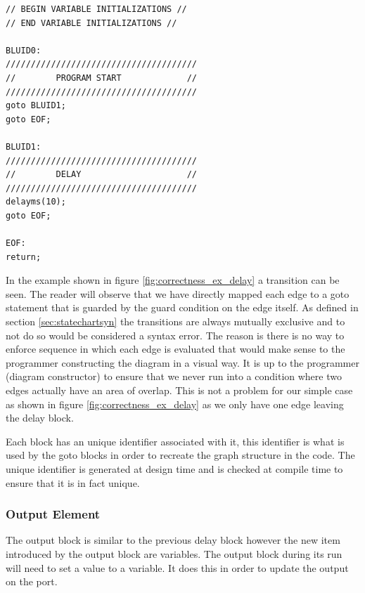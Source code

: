 \begin{minipage}{\textwidth}
\begin{lstlisting}[frame=single]
// BEGIN VARIABLE INITIALIZATIONS //
// END VARIABLE INITIALIZATIONS //

BLUID0:
//////////////////////////////////////
//        PROGRAM START             //
//////////////////////////////////////
goto BLUID1;
goto EOF;

BLUID1:
//////////////////////////////////////
//        DELAY                     //
//////////////////////////////////////
delayms(10);
goto EOF;

EOF:
return;
\end{lstlisting}
\end{minipage}

In the example shown in figure \ref{fig:correctness_ex_delay} a transition can be seen. The reader will observe that we have directly mapped each edge to a goto statement that is guarded by the guard condition on the edge itself. As defined in section \ref{sec:statechartsyn} the transitions are always mutually exclusive and to not do so would be considered a syntax error. The reason is there is no way to enforce sequence in which each edge is evaluated that would make sense to the programmer constructing the diagram in a visual way. It is up to the programmer (diagram constructor) to ensure that we never run into a condition where two edges actually have an area of overlap. This is not a problem for our simple case as shown in figure \ref{fig:correctness_ex_delay} as we only have one edge leaving the delay block.

Each block has an unique identifier associated with it, this identifier is what is used by the goto blocks in order to recreate the graph structure in the code. The unique identifier is generated at design time and is checked at compile time to ensure that it is in fact unique.

\subsubsection{Output Element}

The output block is similar to the previous delay block however the new item introduced by the output block are variables. The output block during its run will need to set a value to a variable. It does this in order to update the output on the port. 

